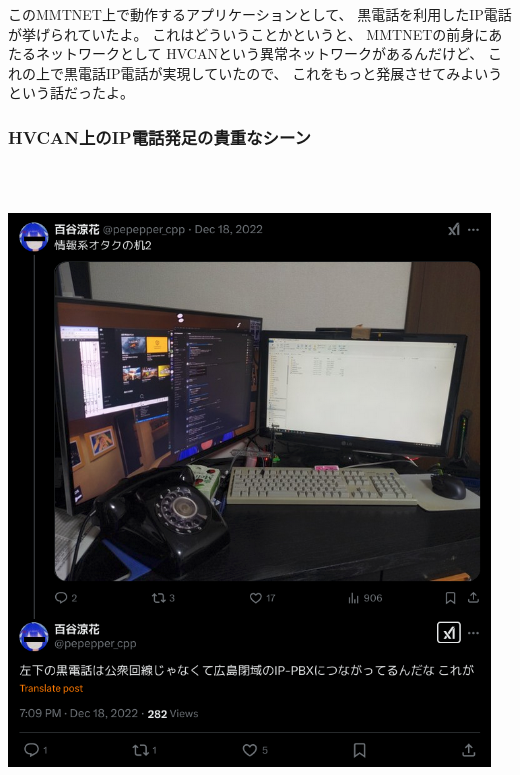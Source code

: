 \documentclass[
  lualatex,
  aspectratio=169,
  14pt
]{beamer}
\begin{document}
\begin{frame}
{    このMMTNET上で動作するアプリケーションとして、
    黒電話を利用したIP電話が挙げられていたよ。
    これはどういうことかというと、
    MMTNETの前身にあたるネットワークとして
    HVCANという異常ネットワークがあるんだけど、
    これの上で黒電話IP電話が実現していたので、
    これをもっと発展させてみよいうという話だったよ。
  }
\end{frame}

\begin{frame}
  \frametitle{HVCAN上のIP電話発足の貴重なシーン}

  ~\\[-.75\baselineskip]
  \begin{columns}[b]
    \begin{column}{.49\textwidth}
      \centering
      \includegraphics[height=.9\textheight]{./images/ijyou.png}
    \end{column}
    \begin{column}{.49\textwidth}
      \centering

\end{column}
\end{columns}
\end{frame}
\end{document}
